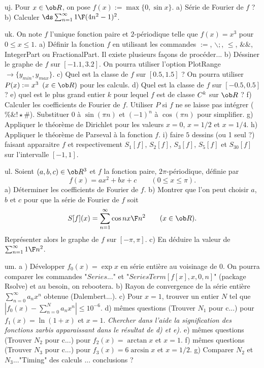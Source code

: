 \exo [Level=2,Fight=0,Learn=0,Type=\Exercices,Field=\SériesDeFourier,Origin=] uj. 
Pour $x\in\ob R$, on pose $f(x):=\max\{0,\sin x\}$. \pn
a) Série de Fourier de $f$ ?\pn
b) Calculer $\ds\sum_{n=1}^\infty{1\F(4n^2-1)^2}$. 

\exo [Level=2,Fight=0,Learn=0,Type=\Maple,Field=\SériesDeFourier,Origin=] uk. On note $f$ l'unique fonction paire et $2$-périodique 
telle que $f(x)=x^3$ pour $0\le x\le1$. \medskip\noindent
a) Définir la fonction $f$ en utilisant les commandes $:=$, $\backslash;$, $\le$, $\&\&$, 
IntegerPart ou FractionalPart. \pn
Il existe plusieurs fa\c cons de procéder... \medskip\noindent
b) Déssiner le graphe de $f$ sur $[-1.1,3.2]$. 
On pourra utiliser l'option PlotRange$\rightarrow\{y_{min},y_{max}\}$. \medskip\noindent
c) Quel est la classe de $f$ sur $[0.5,1.5]$ ? 
On pourra utiliser $P(x):=x^3\ \,(x\in\ob R)$ pour les calculs.\medskip\noindent 
d) Quel est la classe de $f$ sur $[-0.5,0.5]$ ? 
\medskip\noindent
e) quel est le plus grand entier $k$ pour lequel $f$ 
est de classe $\sc C^k$ sur $\ob R$ ? \medskip\noindent
f) Calculer les coefficients de Fourier de $f$. Utiliser $P$ si $f$ 
ne se laisse pas intégrer ($\%\&!\star\#$). Substituer $0$ à $\sin(\pi n)$ 
et $(-1)^n$ à $\cos(\pi n)$ 
pour simplifier. \medskip\noindent
g) Appliquer le théorème de Dirichlet pour les valeurs $x=0$, $x=1/2$ et $x=1/4$. 
\medskip\noindent
h) Appliquer le théorème de Parseval à la fonction $f$. 
\medskip\noindent
i) faire $5$ dessins (ou 1 seul ?) faisant apparaitre $f$ 
et respectivement $S_1[f]$, $S_2[f]$, $S_3[f]$, $S_5[f]$ et $S_{30}[f]$ 
sur l'intervalle $[-1,1]$. 

\exo [Level=2,Fight=0,Learn=0,Type=\Maple,Field=\SériesDeFourier,Origin=] ul. 
Soient $(a,b,c)\in\ob R^3$ et $f$ la fonction paire, $2\pi$-périodique, définie par 
$$
f(x)=ax^2+bx+c\qquad(0\le x\le \pi).
$$
a) Déterminer les coefficients de Fourier de $f$. \medskip\noindent
b) Montrer que l'on peut choisir $a$, $b$ et $c$ pour que la série de Fourier de $f$ soit 
$$
S[f](x)=\sum_{n=1}^\infty{\cos nx\F n^2}\qquad(x\in\ob R).
$$
Représenter alors le graphe de $f$ sur $[-\pi,\pi]$. \medskip\noindent
c) En déduire la valeur de $\sum_{n=1}^\infty{1\F n^2}$. 

\exo [Level=2,Fight=0,Learn=0,Type=\Maple,Field=\SériesDeFourier,Origin=] um. 
a ) Développer $f_0(x)=\exp x$ en série entière au voisinage de $0$. 
On pourra comparer les commandes "$Series...$" et "$SeriesTerm[f[x],{x,0,n}]$" 
(package Rsolve) et au besoin, on rebootera. \medskip\noindent
b) Rayon de convergence de la série entière $\sum_{n=0}^\infty a_nx^n$ obtenue (Dalembert...). \medskip\noindent
c) Pour $x=1$, trouver un entier $N$ tel que 
$|f_0(x)-\sum_{n=0}^Na_nx^n|\le 10^{-6}$.\medskip\noindent
d) mêmes questions (Trouver $N_1$ pour c...) pour $f_1(x)=\ln(1+x)$ et $x=1$. \pn
{\it Chercher dans l'aide la signification 
des fonctions zarbis apparaissant dans le résultat de d) et e).} \pn
e) mêmes questions (Trouver $N_2$ pour c...) pour $f_2(x)=\arctan x$ et $x=1$. \pn
f) mêmes questions (Trouver $N_3$ pour c...) pour $f_3(x)=6\arcsin x$ et $x=1/2$. \pn
g) Comparer $N_2$ et $N_3$..."Timing" des calculs ... conclusions ?

